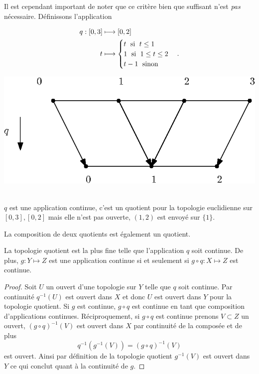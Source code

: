 \documentclass[main.tex]{subfiles}
\begin{document}
	\begin{example}
		Il est cependant important de noter que ce critère bien que suffisant n'est \emph{pas} nécessaire. Définissons l'application\\

		\noindent \begin{minipage}{0.5\textwidth}
		\begin{align*}
			q : [0,3] &\longmapsto [0,2]\\
			t &\longmapsto \begin{cases}
				t \text{\; si \;} t \le 1\\
				1 \text{\; si \;} 1 \le t \le 2\\
				t-1 \text{\; sinon}
			\end{cases}
		.\end{align*}
		\end{minipage}
		\hfill
		\noindent \begin{minipage}{0.5\textwidth}
			\includegraphics[width=\linewidth]{example_1.eps}
		\end{minipage}\\

		$q$ est une application continue, c'est un quotient pour la topologie euclidienne sur $[0,3], [0,2]$ mais elle n'est pas ouverte,  $(1,2)$ est envoyé sur $\{1\}$.
	\end{example}

	\begin{prop}
		La composition de deux quotients est également un quotient.
	\end{prop}
	\begin{prop}
		\label{prp:1}
		La topologie quotient est la plus fine telle que l'application $q$ soit continue. De plus, $g : Y \longmapsto Z$ est une application continue si et seulement si $g \circ q : X \longmapsto Z$ est continue.
	\end{prop}
	\begin{proof}
		Soit $U$ un ouvert d'une topologie sur $Y$ telle que $q$ soit continue. Par continuité $q^{-1}(U)$ est ouvert dans $X$ et donc $U$ est ouvert dans $Y$ pour la topologie quotient. 
	Si $g$ est continue, $g\circ q$ est continue en tant que composition d'applications continues. Réciproquement, si  $g \circ q$ est continue prenons $V \subset Z$ un ouvert, ${(g\circ q)}^{-1}(V)$ est ouvert dans $X$ par continuité de la composée et de plus \[
			q^{-1}(g^{-1}(V)) = {(g\circ q)}^{-1}(V)
		\] est ouvert. Ainsi par définition de la topologie quotient $g^{-1}(V)$ est ouvert dans $Y$ ce qui conclut quant à la continuité de $g$. 
	\end{proof}
\end{document}

